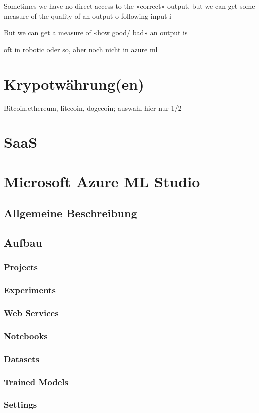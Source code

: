 Sometimes we have no direct access to the
«correct» output, but we can get some
measure of the quality of an output o
following input i

But we can get a measure of «how good/
bad» an output is

oft in robotic oder so, aber noch nicht in azure ml

\section{Krypotwährung(en)}
Bitcoin,ethereum, litecoin, dogecoin; auswahl hier nur 1/2


\section{SaaS}
\section{Microsoft Azure ML Studio}
\subsection{Allgemeine Beschreibung}
\subsection{Aufbau }
\subsubsection{Projects}
\subsubsection{Experiments}
\subsubsection{Web Services}
\subsubsection{Notebooks}
\subsubsection{Datasets}
\subsubsection{Trained Models}
\subsubsection{Settings}
